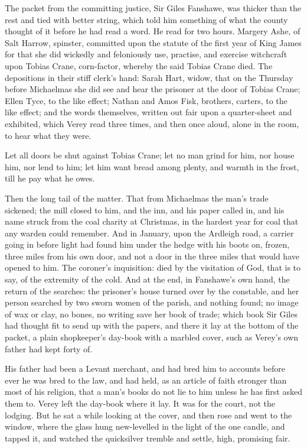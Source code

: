 \documentclass[11pt]{article}
\begin{document}
The packet from the committing justice, Sir Giles Fanshawe, was thicker than the rest and tied with better string, which told him something of what the county thought of it before he had read a word. He read for two hours. Margery Ashe, of Salt Harrow, spinster, committed upon the statute of the first year of King James for that she did wickedly and feloniously use, practise, and exercise witchcraft upon Tobias Crane, corn-factor, whereby the said Tobias Crane died. The depositions in their stiff clerk's hand: Sarah Hart, widow, that on the Thursday before Michaelmas she did see and hear the prisoner at the door of Tobias Crane; Ellen Tyce, to the like effect; Nathan and Amos Fisk, brothers, carters, to the like effect; and the words themselves, written out fair upon a quarter-sheet and exhibited, which Verey read three times, and then once aloud, alone in the room, to hear what they were.

Let all doors be shut against Tobias Crane; let no man grind for him, nor house him, nor lend to him; let him want bread among plenty, and warmth in the frost, till he pay what he owes.

Then the long tail of the matter. That from Michaelmas the man's trade sickened; the mill closed to him, and the inn, and his paper called in, and his name struck from the coal charity at Christmas, in the hardest year for coal that any warden could remember. And in January, upon the Ardleigh road, a carrier going in before light had found him under the hedge with his boots on, frozen, three miles from his own door, and not a door in the three miles that would have opened to him. The coroner's inquisition: died by the visitation of God, that is to say, of the extremity of the cold. And at the end, in Fanshawe's own hand, the return of the searches: the prisoner's house turned over by the constable, and her person searched by two sworn women of the parish, and nothing found; no image of wax or clay, no bones, no writing save her book of trade; which book Sir Giles had thought fit to send up with the papers, and there it lay at the bottom of the packet, a plain shopkeeper's day-book with a marbled cover, such as Verey's own father had kept forty of.

His father had been a Levant merchant, and had bred him to accounts before ever he was bred to the law, and had held, as an article of faith stronger than most of his religion, that a man's books do not lie to him unless he has first asked them to. Verey left the day-book where it lay. It was for the court, not the lodging. But he sat a while looking at the cover, and then rose and went to the window, where the glass hung new-levelled in the light of the one candle, and tapped it, and watched the quicksilver tremble and settle, high, promising fair.
\end{document}
